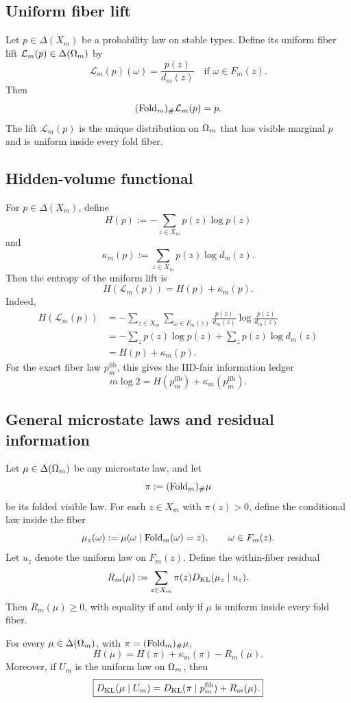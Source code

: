 \subsection{Uniform fiber lift}

Let \(p\in\Delta(X_m)\) be a probability law on stable types.  Define its uniform fiber lift \(\mathcal L_m(p)\in\Delta(\Omega_m)\) by
\[
\mathcal L_m(p)(\omega)=\frac{p(z)}{d_m(z)}
\quad\text{if }\omega\in F_m(z).
\]
Then
\[
(\operatorname{Fold}_m)_\#\mathcal L_m(p)=p.
\]
The lift \(\mathcal L_m(p)\) is the unique distribution on \(\Omega_m\) that has visible marginal \(p\) and is uniform inside every fold fiber.

\subsection{Hidden-volume functional}

For \(p\in\Delta(X_m)\), define
\[
H(p):=-\sum_{z\in X_m}p(z)\log p(z)
\]
and
\[
\kappa_m(p):=\sum_{z\in X_m}p(z)\log d_m(z).
\]
Then the entropy of the uniform lift is
\[
\boxed{
H(\mathcal L_m(p))=H(p)+\kappa_m(p).
}
\]
Indeed,
\[
\begin{aligned}
H(\mathcal L_m(p))
&=
-\sum_{z\in X_m}\sum_{\omega\in F_m(z)}
\frac{p(z)}{d_m(z)}
\log\frac{p(z)}{d_m(z)}  \\
&=
-\sum_z p(z)\log p(z)
+\sum_z p(z)\log d_m(z)  \\
&=H(p)+\kappa_m(p).
\end{aligned}
\]
For the exact fiber law \(p_m^{\mathrm{fib}}\), this gives the IID-fair information ledger
\[
\boxed{
m\log2=H(p_m^{\mathrm{fib}})+\kappa_m(p_m^{\mathrm{fib}}).
}
\]

\subsection{General microstate laws and residual information}

Let \(\mu\in\Delta(\Omega_m)\) be any microstate law, and let
\[
\pi:=(\operatorname{Fold}_m)_\#\mu
\]
be its folded visible law.  For each \(z\in X_m\) with \(\pi(z)>0\), define the conditional law inside the fiber
\[
\mu_z(\omega):=\mu(\omega\mid \operatorname{Fold}_m(\omega)=z),
\qquad \omega\in F_m(z).
\]
Let \(u_z\) denote the uniform law on \(F_m(z)\).  Define the within-fiber residual
\[
R_m(\mu):=
\sum_{z\in X_m}\pi(z)D_{\mathrm{KL}}(\mu_z\mid u_z).
\]
Then \(R_m(\mu)\ge0\), with equality if and only if \(\mu\) is uniform inside every fold fiber.

\begin{theorem}
\label{thm:exact-information-ledger}
For every \(\mu\in\Delta(\Omega_m)\), with \(\pi=(\operatorname{Fold}_m)_\#\mu\),
\[
\boxed{
H(\mu)=H(\pi)+\kappa_m(\pi)-R_m(\mu).
}
\]
Moreover, if \(U_m\) is the uniform law on \(\Omega_m\), then
\[
\boxed{
D_{\mathrm{KL}}(\mu\mid U_m)
=
D_{\mathrm{KL}}(\pi\mid p_m^{\mathrm{fib}})
+R_m(\mu).
}
\]
\end{theorem}

